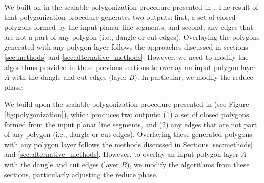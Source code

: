 We built on in the scalable polygonization procedure presented in \cite{abdelhafeez_ddcel_2023}.  The result of that polygonization procedure generates two outputs: first, a set of closed polygons formed by the input planar line segments, and second, any edges that are not a part of any polygon (i.e., dangle or cut edges).  Overlaying the polygons generated with any polygon layer follows the approaches discussed in sections \ref{sec:methods} and \ref{sec:alternative_methods}.  However, we need to modify the algorithms provided in these previous sections to overlay an input polygon layer $A$ with the dangle and cut edges (layer $B$). In particular, we modify the reduce phase.

We build upon the scalable polygonization procedure presented in \cite{abdelhafeez_ddcel_2023} (see Figure \ref{fig:polygonization}), which produces two outputs: (1) a set of closed polygons formed from the input planar line segments, and (2) any edges that are not part of any polygon (i.e., dangle or cut edges). Overlaying these generated polygons with any polygon layer follows the methods discussed in Sections \ref{sec:methods} and \ref{sec:alternative_methods}. However, to overlay an input polygon layer $A$ with the dangle and cut edges (layer $B$), we modify the algorithms from these sections, particularly adjusting the reduce phase.


